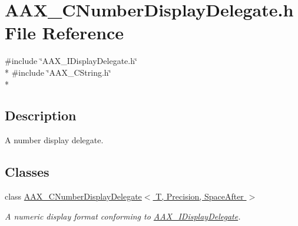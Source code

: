\hypertarget{a00180}{}\section{A\+A\+X\+\_\+\+C\+Number\+Display\+Delegate.\+h File Reference}
\label{a00180}
{\ttfamily \#include \char`\"{}A\+A\+X\+\_\+\+I\+Display\+Delegate.\+h\char`\"{}}\\*
{\ttfamily \#include \char`\"{}A\+A\+X\+\_\+\+C\+String.\+h\char`\"{}}\\*


\subsection{Description}
A number display delegate. 

\subsection*{Classes}
\begin{DoxyCompactItemize}
\item 
class \hyperlink{a00028}{A\+A\+X\+\_\+\+C\+Number\+Display\+Delegate$<$ T, Precision, Space\+After $>$}
\begin{DoxyCompactList}\small\item\em A numeric display format conforming to \hyperlink{a00092}{A\+A\+X\+\_\+\+I\+Display\+Delegate}. \end{DoxyCompactList}\end{DoxyCompactItemize}
